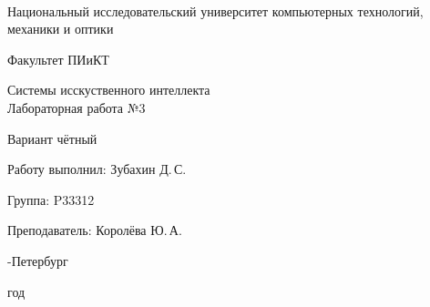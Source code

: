 \thispagestyle{empty}

\onecolumn
\begin{center}
	\
\vspace{1 cm}

\huge Национальный исследовательский университет компьютерных технологий, механики и оптики
\vspace{0.5cm}

\Huge Факультет ПИиКТ

\vspace{5cm}
\huge Системы исскуственного интеллекта  \\
Лабораторная работа №3
\smallskip

Вариант чётный
\vspace{0.2cm}

\end{center}
\vspace{6 cm}

\begin{flushright}
\Large

Работу выполнил: Зубахин Д.\,С.
\smallskip

Группа: P33312
\smallskip

Преподаватель: Королёва Ю.\,А.
\smallskip

\vspace{4cm}
	
-Петербург

 год
\end{flushright}
